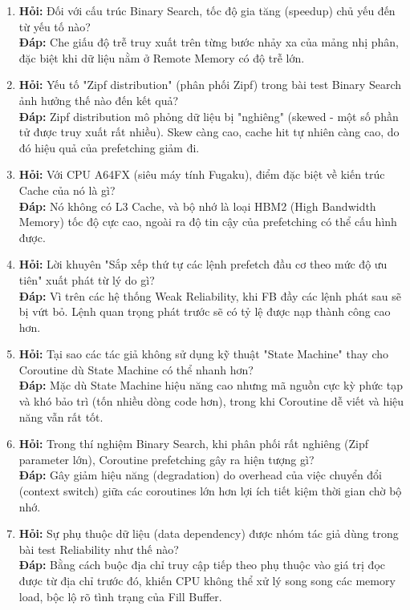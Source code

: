 \documentclass[12pt,a4paper]{article}
\begin{document}
\begin{enumerate}
    \item \textbf{Hỏi:} Đối với cấu trúc Binary Search, tốc độ gia tăng (speedup) chủ yếu đến từ yếu tố nào? \\
    \textbf{Đáp:} Che giấu độ trễ truy xuất trên từng bước nhảy xa của mảng nhị phân, đặc biệt khi dữ liệu nằm ở Remote Memory có độ trễ lớn.
    
    \item \textbf{Hỏi:} Yếu tố "Zipf distribution" (phân phối Zipf) trong bài test Binary Search ảnh hưởng thế nào đến kết quả? \\
    \textbf{Đáp:} Zipf distribution mô phỏng dữ liệu bị "nghiêng" (skewed - một số phần tử được truy xuất rất nhiều). Skew càng cao, cache hit tự nhiên càng cao, do đó hiệu quả của prefetching giảm đi.
    
    \item \textbf{Hỏi:} Với CPU A64FX (siêu máy tính Fugaku), điểm đặc biệt về kiến trúc Cache của nó là gì? \\
    \textbf{Đáp:} Nó không có L3 Cache, và bộ nhớ là loại HBM2 (High Bandwidth Memory) tốc độ cực cao, ngoài ra độ tin cậy của prefetching có thể cấu hình được.
    
    \item \textbf{Hỏi:} Lời khuyên "Sắp xếp thứ tự các lệnh prefetch đầu cơ theo mức độ ưu tiên" xuất phát từ lý do gì? \\
    \textbf{Đáp:} Vì trên các hệ thống Weak Reliability, khi FB đầy các lệnh phát sau sẽ bị vứt bỏ. Lệnh quan trọng phát trước sẽ có tỷ lệ được nạp thành công cao hơn.
    
    \item \textbf{Hỏi:} Tại sao các tác giả không sử dụng kỹ thuật "State Machine" thay cho Coroutine dù State Machine có thể nhanh hơn? \\
    \textbf{Đáp:} Mặc dù State Machine hiệu năng cao nhưng mã nguồn cực kỳ phức tạp và khó bảo trì (tốn nhiều dòng code hơn), trong khi Coroutine dễ viết và hiệu năng vẫn rất tốt.
    
    \item \textbf{Hỏi:} Trong thí nghiệm Binary Search, khi phân phối rất nghiêng (Zipf parameter lớn), Coroutine prefetching gây ra hiện tượng gì? \\
    \textbf{Đáp:} Gây giảm hiệu năng (degradation) do overhead của việc chuyển đổi (context switch) giữa các coroutines lớn hơn lợi ích tiết kiệm thời gian chờ bộ nhớ.
    
    \item \textbf{Hỏi:} Sự phụ thuộc dữ liệu (data dependency) được nhóm tác giả dùng trong bài test Reliability như thế nào? \\
    \textbf{Đáp:} Bằng cách buộc địa chỉ truy cập tiếp theo phụ thuộc vào giá trị đọc được từ địa chỉ trước đó, khiến CPU không thể xử lý song song các memory load, bộc lộ rõ tình trạng của Fill Buffer.
    

\end{enumerate}
\end{document}
